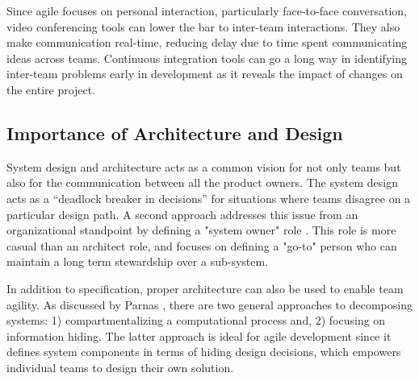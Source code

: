 Since agile focuses on personal interaction, particularly face-to-face conversation, video conferencing tools can lower the bar to inter-team interactions.
They also make communication real-time, reducing delay due to time spent communicating ideas across teams.
Continuous integration tools can go a long way in identifying inter-team problems early in development
as it reveals the impact of changes on the entire project.


\subsection{Importance of Architecture and Design}\label{sec:imp_of_dsgn}

System design and architecture acts as a common vision for not only teams but also for the communication between all the product owners.
The system design acts as a “deadlock breaker in decisions” \cite{architecureRole_article} for situations where teams disagree on a particular design path.
A second approach addresses this issue from an organizational standpoint by defining a "system owner" role \cite{kniberg12}.
This role is more casual than an architect role, and focuses on defining a "go-to" person who can maintain a long term stewardship over a sub-system. 

In addition to specification, proper architecture can also be used to enable team agility.
As discussed by Parnas \cite{Parnas72}, there are two general approaches to decomposing systems: 1) compartmentalizing a computational process and, 2) focusing on information hiding.
The latter approach is ideal for agile development since it defines system components in terms of hiding design decisions, which empowers individual teams to design their own solution.